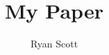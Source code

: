 \documentclass[10pt, sigconf,anonymous]{acmart}
\author{Ryan Scott}
\begin{document}
\title{My Paper}










\end{document}
